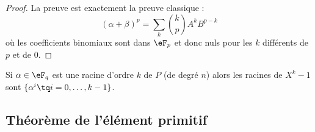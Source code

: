 \begin{proof}
    La preuve est exactement la preuve classique :
    \begin{equation}
        (\alpha+\beta)^p=\sum_k{k\choose p} A^kB^{p-k}
    \end{equation}
    où les coefficients binomiaux sont dans \( \eF_p\) et donc nuls pour les \( k\) différents de \( p\) et de \( 0\).
\end{proof}

\begin{lemma}
    Si \( \alpha\in \eF_q\) est une racine d'ordre \( k\) de \( P\) (de degré \( n\)) alors les racines de \( X^k-1\) sont \( \{ \alpha^i\tq i=0,\ldots, k-1 \}\).
\end{lemma}

\subsection{Théorème de l'élément primitif}

